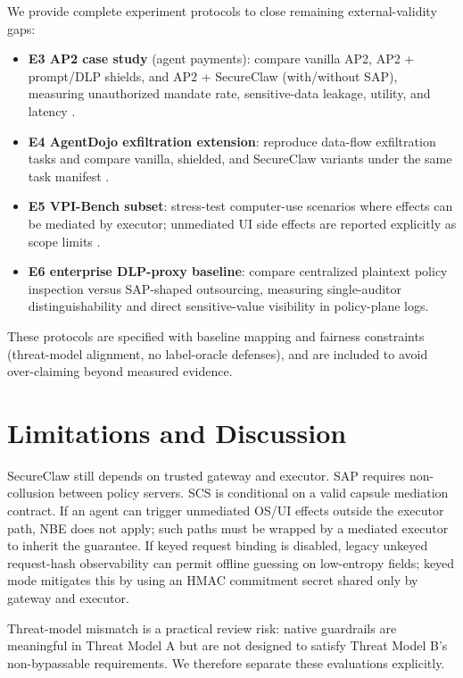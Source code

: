 We provide complete experiment protocols to close remaining external-validity gaps:
\begin{itemize}
  \item \textbf{E3 AP2 case study} (agent payments): compare vanilla AP2, AP2 + prompt/DLP shields, and AP2 + SecureClaw (with/without SAP), measuring unauthorized mandate rate, sensitive-data leakage, utility, and latency \citep{ap2spec2025,whisperswealth2026}.
  \item \textbf{E4 AgentDojo exfiltration extension}: reproduce data-flow exfiltration tasks and compare vanilla, shielded, and SecureClaw variants under the same task manifest \citep{alizadeh2025simple,agentdojo2024}.
  \item \textbf{E5 VPI-Bench subset}: stress-test computer-use scenarios where effects can be mediated by executor; unmediated UI side effects are reported explicitly as scope limits \citep{vpibench2025}.
  \item \textbf{E6 enterprise DLP-proxy baseline}: compare centralized plaintext policy inspection versus SAP-shaped outsourcing, measuring single-auditor distinguishability and direct sensitive-value visibility in policy-plane logs.
\end{itemize}

These protocols are specified with baseline mapping and fairness constraints (threat-model alignment, no label-oracle defenses), and are included to avoid over-claiming beyond measured evidence.

\section{Limitations and Discussion}
\label{sec:limits}

SecureClaw still depends on trusted gateway and executor.
SAP requires non-collusion between policy servers.
SCS is conditional on a valid capsule mediation contract.
If an agent can trigger unmediated OS/UI effects outside the executor path, NBE does not apply; such paths must be wrapped by a mediated executor to inherit the guarantee.
If keyed request binding is disabled, legacy unkeyed request-hash observability can permit offline guessing on low-entropy fields; keyed mode mitigates this by using an HMAC commitment secret shared only by gateway and executor.

Threat-model mismatch is a practical review risk: native guardrails are meaningful in Threat Model A but are not designed to satisfy Threat Model B's non-bypassable requirements.
We therefore separate these evaluations explicitly.

